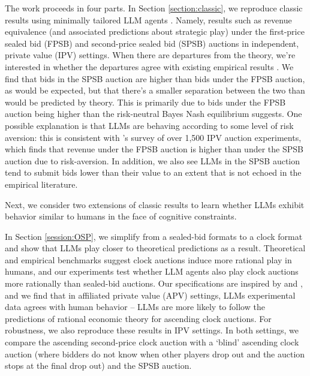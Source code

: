 \documentclass{article} %
\begin{document}
The work proceeds in four parts. 
In Section \ref{section:classic}, we reproduce classic results using minimally tailored LLM agents \citep{krishna2009auction}. 
Namely, results such as revenue equivalence (and associated predictions about strategic play) under the first-price sealed bid (FPSB) and second-price sealed bid (SPSB) auctions in independent, private value (IPV) settings. When there are departures from the theory, we’re interested in whether the departures agree with existing empirical results \citep{kagel2020handbook}. 
We find that bids in the SPSB auction are higher than bids under the FPSB auction, as would be expected, but that there’s a smaller separation between the two than would be predicted by theory. This is primarily due to bids under the FPSB auction being higher than the risk-neutral Bayes Nash equilibrium suggests. One possible explanation is that LLMs are behaving according to some level of risk aversion: this is consistent with \citet{cox1986controlled}'s survey of over 1,500 IPV auction experiments, which finds that revenue under the FPSB auction is higher than under the SPSB auction due to risk-aversion. In addition, we also see LLMs in the SPSB auction tend to submit bids lower than their value to an extent that is not echoed in the empirical literature. 

Next, we consider two extensions of classic results to learn whether LLMs exhibit behavior similar to humans in the face of cognitive constraints.

In Section \ref{session:OSP}, we simplify from a sealed-bid formats to a clock format and show that LLMs play closer to theoretical predictions as a result. Theoretical and empirical benchmarks suggest clock auctions induce more rational play in humans, and our experiments test whether LLM agents also play clock auctions more rationally than sealed-bid auctions. Our specifications are inspired by \citet{li2017obviously} and \citet{breitmoser2022obviousness}, and we find that in affiliated private value (APV) settings, LLMs experimental data agrees with human behavior -- LLMs are more likely to follow the predictions of rational economic theory for ascending clock auctions. For robustness, we also reproduce these results in IPV settings. In both settings, we compare the ascending second-price clock auction with a `blind' ascending clock auction (where bidders do not know when other players drop out and the auction stops at the final drop out) and the SPSB auction. 
\end{document}
